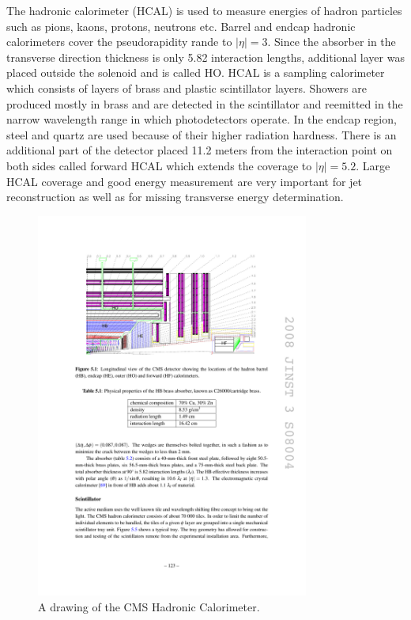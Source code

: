 The hadronic calorimeter (HCAL) is used to measure energies of hadron particles such as pions, kaons, protons, neutrons etc. Barrel and endcap hadronic calorimeters cover the pseudorapidity rande to $|\eta|=3$. 
Since the absorber in the transverse direction thickness is only 5.82 interaction lengths, additional layer was placed outside the solenoid and is called HO. HCAL is a sampling calorimeter which consists of layers of brass and plastic scintillator layers. Showers are produced mostly in brass and are detected in the scintillator and reemitted in the narrow wavelength range in which photodetectors operate. In the endcap region, steel and quartz are used because of their higher radiation hardness. There is an additional part of the detector placed 11.2 meters from the interaction point on both sides called forward HCAL which extends the coverage to $|\eta|=5.2$. Large HCAL coverage and good energy measurement are very important for jet reconstruction as well as for missing transverse energy determination.  
\begin{figure}[htbp]
	\centering
		\includegraphics[width=0.8\textwidth]{Figures/HCAL.pdf}
	\caption[CMS Hadronic Calorimeter]{A drawing of the CMS Hadronic Calorimeter. \cite{Chatrchyan:2008aa}}
	\label{fig:HCAL}
\end{figure}


